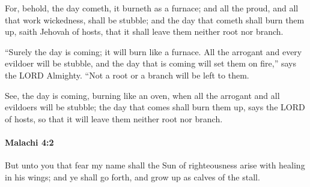 			\begin{versebox}
					\item[BHS] 
					\item[LXX] 
					\item[ASV] For, behold, the day cometh, it burneth as a furnace; and all the proud, and all that work wickedness, shall be stubble; and the day that cometh shall burn them up, saith Jehovah of hosts, that it shall leave them neither root nor branch.
					\item[NIV] “Surely the day is coming; it will burn like a furnace. All the arrogant and every evildoer will be stubble, and the day that is coming will set them on fire,” says the LORD Almighty. “Not a root or a branch will be left to them.
					\item[NRSV] See, the day is coming, burning like an oven, when all the arrogant and all evildoers will be stubble; the day that comes shall burn them up, says the LORD of hosts, so that it will leave them neither root nor branch.
			\end{versebox}

		\paragraph{Malachi 4:2} %
			\label{MALACHI-4-2}

			But unto you that fear my name shall the Sun of righteousness arise with healing in his wings; and ye shall go forth, and grow up as calves of the stall.

